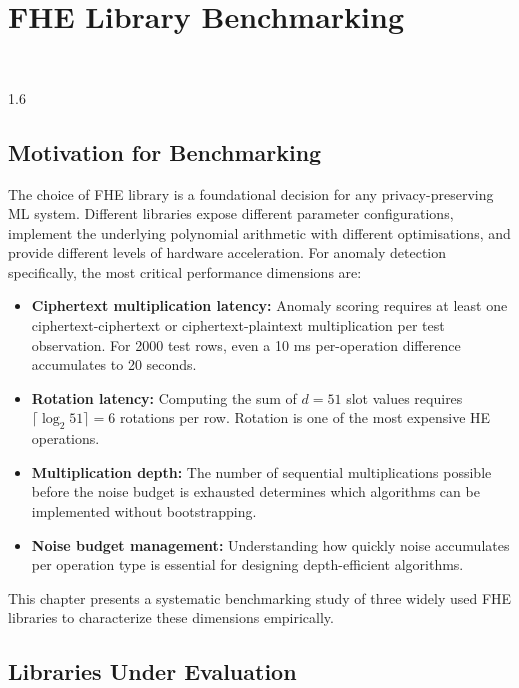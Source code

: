 \chapter{FHE Library Benchmarking}
\HRule\\[2cm]
\label{Chapter3}

\begin{spacing}{1.6}

\section{Motivation for Benchmarking}

The choice of FHE library is a foundational decision for any privacy-preserving
ML system. Different libraries expose different parameter configurations,
implement the underlying polynomial arithmetic with different optimisations,
and provide different levels of hardware acceleration. For anomaly detection
specifically, the most critical performance dimensions are:

\begin{itemize}
  \item \textbf{Ciphertext multiplication latency:} Anomaly scoring requires
  at least one ciphertext-ciphertext or ciphertext-plaintext multiplication per
  test observation. For 2000 test rows, even a 10 ms per-operation difference
  accumulates to 20 seconds.
  \item \textbf{Rotation latency:} Computing the sum of $d = 51$ slot values
  requires $\lceil \log_2 51 \rceil = 6$ rotations per row. Rotation is one of
  the most expensive HE operations.
  \item \textbf{Multiplication depth:} The number of sequential multiplications
  possible before the noise budget is exhausted determines which algorithms can
  be implemented without bootstrapping.
  \item \textbf{Noise budget management:} Understanding how quickly noise
  accumulates per operation type is essential for designing depth-efficient
  algorithms.
\end{itemize}

This chapter presents a systematic benchmarking study of three widely used FHE
libraries to characterize these dimensions empirically.

\section{Libraries Under Evaluation}


\end{spacing}

